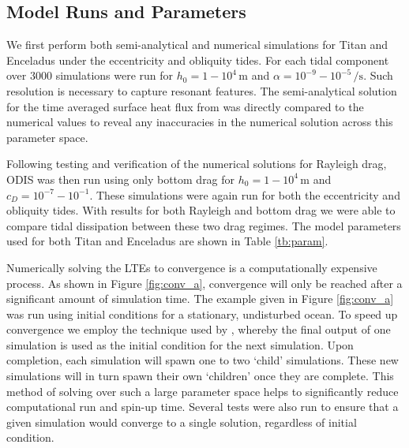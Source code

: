 \subsection{Model Runs and Parameters \label{subsec:param}}



We first perform both semi-analytical and numerical simulations for Titan and Enceladus under the eccentricity and obliquity tides. For each tidal component over 3000 simulations were run for \hbox{$h_0 = 1 - 10^4 \, \si{\metre}$} and \hbox{$\alpha = 10^{-9} - 10^{-5} \, \si{\per\second}$}. Such resolution is necessary to capture resonant features. The semi-analytical solution for the time averaged surface heat flux from \citet{matsuyama2014tidal} was directly compared to the numerical values to reveal any inaccuracies in the numerical solution across this parameter space. 

Following testing and verification of the numerical solutions for Rayleigh drag, ODIS was then run using only bottom drag for \hbox{$h_0 = 1 - 10^4 \, \si{\metre}$} and \hbox{$c_D = 10^{-7} - 10^{-1}$}. These simulations were again run for both the eccentricity and obliquity tides. With results for both Rayleigh and bottom drag we were able to compare tidal dissipation between these two drag regimes. The model parameters used for both Titan and Enceladus are shown in Table \ref{tb:param}.

Numerically solving the LTEs to convergence is a computationally expensive process. As shown in Figure \ref{fig:conv_a}, convergence will only be reached after a significant amount of simulation time. The example given in Figure \ref{fig:conv_a} was run using initial conditions for a stationary, undisturbed ocean. To speed up convergence we employ the technique used by \citet{sears1995tidal}, whereby the final output of one simulation is used as the initial condition for the next simulation. Upon completion, each simulation will spawn one to two `child' simulations. These new simulations will in turn spawn their own `children' once they are complete. This method of solving over such a large parameter space helps to significantly reduce computational run and spin-up time. Several tests were also run to ensure that a given simulation would converge to a single solution, regardless of initial condition.




